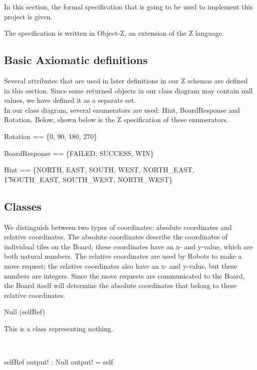 In this section, the formal specification that is going to be used to implement this project is given.

The specification is written in Object-Z, an extension of the Z language.

\subsection{Basic Axiomatic definitions}
Several attributes that are used in later definitions in our Z schemas are defined in this section. Since some returned objects in our class diagram may contain null values, we have defined it as a separate set. \\
In our class diagram, several enumerators are used: Hint, BoardResponse and Rotation. Below, shown below is the Z specification of these enumerators.

\begin{axdef}
Rotation == \{0, 90, 180, 270\}
\end{axdef}

\begin{axdef}
BoardResponse == \{FAILED, SUCCESS, WIN\}
\end{axdef}

\begin{axdef}
Hint == \{NORTH, EAST, SOUTH, WEST, NORTH\_EAST, \\ \t1 SOUTH\_EAST, SOUTH\_WEST, NORTH\_WEST\}
\end{axdef}

\subsection{Classes}
We distinguish between two types of coordinates: absolute coordinates and relative coordinates. The absolute coordinates describe the coordinates of individual tiles on the Board; these coordinates have an x- and y-value, which are both natural numbers. The relative coordinates are used by Robots to make a move request; the relative coordinates also have an x- and y-value, but these numbers are integers. Since the move requests are communicated to the Board, the Board itself will determine the absolute coordinates that belong to these relative coordinates.

\begin{class}{Null}
\upharpoonright (selfRef) \\
\begin{classcom}
This is a class representing nothing.
\end{classcom} \\
\begin{schema}{selfRef}
output! : Null
\where
output! = self
\end{schema}
\end{class}

